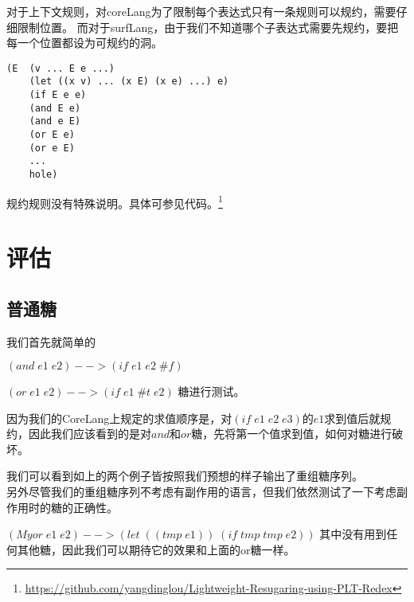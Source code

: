 对于上下文规则，对coreLang为了限制每个表达式只有一条规则可以规约，需要仔细限制位置。
而对于surfLang，由于我们不知道哪个子表达式需要先规约，要把每一个位置都设为可规约的洞。
\begin{verbatim}
(E  (v ... E e ...)
	(let ((x v) ... (x E) (x e) ...) e)
	(if E e e)
	(and E e)
	(and e E)
	(or E e)
	(or e E)
	...
	hole)
\end{verbatim}

规约规则没有特殊说明。具体可参见代码。\footnote{\url{https://github.com/yangdinglou/Lightweight-Resugaring-using-PLT-Redex}}

\pagebreak
\section{评估}

\subsection{普通糖}

我们首先就简单的

$(and\;e1\;e2)-->(if\;e1\;e2\;\#f)$

$(or\;e1\;e2)-->(if\;e1\;\#t\;e2)$
糖进行测试。

因为我们的CoreLang上规定的求值顺序是，对$(if \;e1\;e2\;e3)$的$e1$求到值后就规约，因此我们应该看到的是对$and$和$or$糖，先将第一个值求到值，如何对糖进行破坏。



我们可以看到如上的两个例子皆按照我们预想的样子输出了重组糖序列。\\[6pt]

另外尽管我们的重组糖序列不考虑有副作用的语言，但我们依然测试了一下考虑副作用时的糖的正确性。

$(Myor\;e1\;e2)-->(let\;((tmp\;e1))\;(if\;tmp\;tmp\;e2))$
其中没有用到任何其他糖，因此我们可以期待它的效果和上面的or糖一样。


